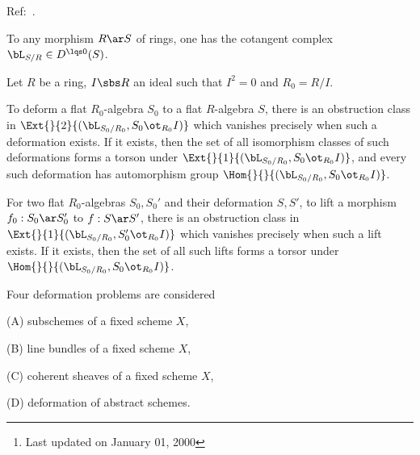 \documentclass[a4paper, twoside]{article}
\begin{document}
\ifmain
    \title{}
    \author{Cong Wen, 02/24}
    \makeatletter
    \makeatother

    \maketitle
    \begin{abstract}
        Notes\footnote{Last updated on January 01, 2000} on deformation theory.
    \end{abstract}

    \tableofcontents
\fi

Ref:~\cite{Illusie1971,Illusie1972,Hartshorne2010}.

\begin{stp}
	To any morphism $R\ar S$ of rings, one has the cotangent complex $\bL_{S/R}\in D^{\lqs0}(S)$.
\end{stp}

\begin{thm}
	Let $R$ be a ring, $I\sbs R$ an ideal such that $I^{2}=0$ and $R_{0}=R/I$.

	To deform a flat $R_{0}$-algebra $S_{0}$ to a flat $R$-algebra $S$, there is an obstruction class in $\Ext{}{2}{(\bL_{S_{0}/R_{0}},S_{0}\ot_{R_{0}}I)}$ which vanishes precisely when such a deformation exists. If it exists, then the set of all isomorphism classes of such deformations forms a torson under $\Ext{}{1}{(\bL_{S_{0}/R_{0}},S_{0}\ot_{R_{0}}I)}$, and every such deformation has automorphism group $\Hom{}{}{(\bL_{S_{0}/R_{0}},S_{0}\ot_{R_{0}}I)}$.

	For two flat $R_{0}$-algebras $S_{0},S_{0}'$ and their deformation $S,S'$, to lift a morphism $f_{0}:S_{0}\ar S_{0}'$ to $f:S\ar S'$, there is an obstruction class in $\Ext{}{1}{(\bL_{S_{0}/R_{0}},S_{0}'\ot_{R_{0}}I)}$ which vanishes precisely when such a lift exists. If it exists, then the set of all such lifts forms a torsor under $\Hom{}{}{(\bL_{S_{0}/R_{0}},S_{0}\ot_{R_{0}}I)}$.
\end{thm}


Four deformation problems are considered
\begin{enr}
	\item (A) subschemes of a fixed scheme $X$,
	\item (B) line bundles of a fixed scheme $X$,
	\item (C) coherent sheaves of a fixed scheme $X$,
	\item (D) deformation of abstract schemes.
\end{enr}
\end{document}
